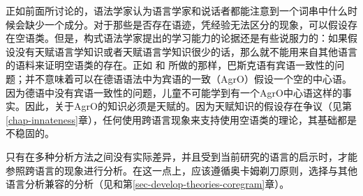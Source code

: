 正如前面所讨论的，语法学家认为语言学家和说话者都能注意到一个词串中什么时候会缺少一个成分。对于那些是否存在语迹，凭经验无法区分的现象，可以假设存在空语类。但是，构式语法学家提出的学习能力的论据还是有些说服力的：如果假设没有天赋语言学知识或者天赋语言学知识很少的话，那么就不能用来自其他语言的语料来证明空语类的存在。正如 \citet{Stechow96a}和 \citet{Meinunger2000a}所做的那样，巴斯克语有宾语一致性的问题；并不意味着可以在德语语法中为宾语的一致（AgrO）假设一个空的中心语。因为德语中没有宾语一致性的问题，儿童不可能学到有一个AgrO中心语这样的事实。因此，关于AgrO的知识必须是天赋的。因为天赋知识的假设存在争议（见第\ref{chap-innateness}章），任何使用跨语言现象来支持使用空语类的理论，其基础都是不稳固的。

只有在多种分析方法之间没有实际差异，并且受到当前研究的语言的启示时，才能参照跨语言的现象进行分析。在这一点上，应该遵循奥卡姆剃刀原则，选择与其他语言分析兼容的分析（见\citet{MuellerCoreGram}和第\ref{sec-develop-theories-coregram}章）。

